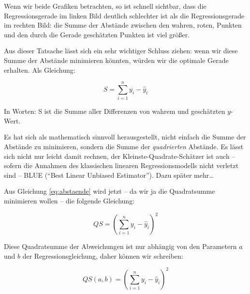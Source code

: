 \documentclass[ngerman, 12pt]{scrartcl}
\def\sm{\sum\limits_{i=1}^{n}}
\begin{document}
Wenn wir beide Grafiken betrachten, so ist schnell sichtbar, dass die Regressionsgerade im linken Bild deutlich schlechter ist als die Regressionsgerade im rechten Bild: die Summe der Abstände zwischen den wahren, roten, Punkten und den durch die Gerade geschätzten Punkten ist viel größer.


Aus dieser Tatsache lässt sich ein sehr wichtiger Schluss ziehen: wenn wir diese Summe der Abstände minimieren könnten, würden wir die optimale Gerade erhalten. Als Gleichung:

\begin{equation}
S = \sm y_i - \hat{y}_i
\end{equation}\label{eq:abstaende}

In Worten: S ist die Summe aller Differenzen von wahrem und geschätzten $y$-Wert.

Es hat sich als mathematisch sinnvoll herausgestellt, nicht einfach die Summe der Abstände zu minimieren, sondern die Summe der \textit{quadrierten} Abstände. Es lässt sich nicht nur leicht damit rechnen, der Kleinste-Quadrate-Schätzer ist auch -- sofern die  Annahmen des klassischen linearen Regressionsmodells nicht verletzt sind -- BLUE (\enquote{Best Linear Unbiased Estimator}). Dazu später mehr\ldots

Aus Gleichung \ref{eq:abstaende} wird jetzt -- da wir ja die Quadratsumme minimieren wollen -- die folgende Gleichung:

\begin{equation}
QS = \left(\sm y_i - \hat{y}_i\right)^2
\end{equation}\label{eq:qabstaende}

Diese Quadratsumme der Abweichungen ist nur abhängig von den Parametern \(a\) und \(b\) der Regressionsgleichung, daher können wir schreiben:

\begin{equation}
QS(a,b) = \left(\sm y_i - \hat{y}_i\right)^2
\end{equation}\label{eq:qabstaende2}


\end{document}
